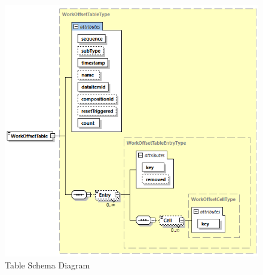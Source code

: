 \FloatBarrier


\begin{figure}[ht]
  \centering
    \includegraphics[width=1.0\textwidth]{figures/Table Schema.png}
  \caption{Table Schema Diagram}
  \label{fig:Table Schema Diagram}
\end{figure}

\FloatBarrier
